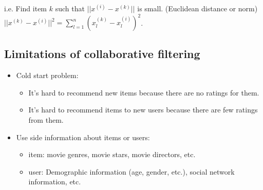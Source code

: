 i.e. Find item $k$ such that $||x^{(i)} - x ^{(k)}||$ is small. (Euclidean distance or norm)
$||x^{(k)} - x^{(i)}||^2 = \sum_{l=1}^{n}\left(x_l^{(k)} - x_l^{(i)}\right)^2$.

\subsection*{Limitations of collaborative filtering}
\begin{itemize}
    \item Cold start problem:
    \begin{itemize}
        \item It's hard to recommend new items because there are no ratings for them. 
        \item It's hard to recommend items to new users because there are few ratings from them.
    \end{itemize}
    \item Use side information about items or users:
    \begin{itemize}
        \item item: movie genres, movie stars, movie directors, etc.
        \item user: Demographic information (age, gender, etc.), social network information, etc.
    \end{itemize}
\end{itemize}